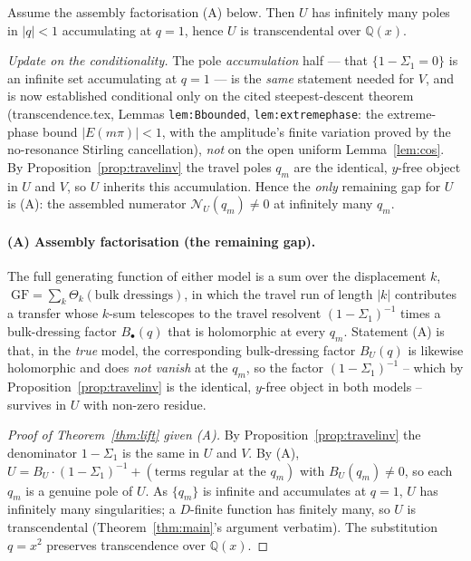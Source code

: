 \begin{theorem}\label{thm:lift}
Assume the assembly factorisation \textup{(A)} below.  Then $U$ has infinitely many
poles in $|q|<1$ accumulating at $q=1$, hence $U$ is transcendental over $\mathbb
Q(x)$.
\end{theorem}

\noindent\emph{Update on the conditionality.} The pole \emph{accumulation} half --- that
$\{1-\Sigma_1=0\}$ is an infinite set accumulating at $q=1$ --- is the \emph{same} statement
needed for $V$, and is now established conditional only on the cited steepest-descent theorem
(transcendence.tex, Lemmas \texttt{lem:Bbounded}, \texttt{lem:extremephase}: the extreme-phase
bound $|E(m\pi)|<1$, with the amplitude's finite variation proved by the no-resonance Stirling
cancellation), \emph{not} on the open uniform Lemma~\ref{lem:cos}. By
Proposition~\ref{prop:travelinv} the travel poles $q_m$ are the identical, $y$-free object in
$U$ and $V$, so $U$ inherits this accumulation. Hence the \emph{only} remaining gap for $U$ is
(A): the assembled numerator $\mathcal N_U(q_m)\ne0$ at infinitely many $q_m$.

\paragraph{(A) Assembly factorisation (the remaining gap).}
The full generating function of either model is a sum over the displacement $k$,
$\;\mathrm{GF}=\sum_{k}\Theta_k(\text{bulk dressings})$, in which the travel run of
length $|k|$ contributes a transfer whose $k$-sum telescopes to the travel resolvent
$(1-\Sigma_1)^{-1}$ times a bulk-dressing factor $B_\bullet(q)$ that is holomorphic
at every $q_m$.  Statement (A) is that, in the \emph{true} model, the corresponding
bulk-dressing factor $B_U(q)$ is likewise holomorphic and does \emph{not vanish} at
the $q_m$, so the factor $(1-\Sigma_1)^{-1}$ -- which by
Proposition~\ref{prop:travelinv} is the identical, $y$-free object in both models --
survives in $U$ with non-zero residue.

\begin{proof}[Proof of Theorem~\ref{thm:lift} given (A)]
By Proposition~\ref{prop:travelinv} the denominator $1-\Sigma_1$ is the same in $U$
and $V$.  By (A), $U=B_U\cdot(1-\Sigma_1)^{-1}+(\text{terms regular at the }q_m)$
with $B_U(q_m)\ne0$, so each $q_m$ is a genuine pole of $U$.  As $\{q_m\}$ is
infinite and accumulates at $q=1$, $U$ has infinitely many singularities; a $D$-finite
function has finitely many, so $U$ is transcendental
(Theorem~\ref{thm:main}'s argument verbatim).  The substitution $q=x^2$ preserves
transcendence over $\mathbb Q(x)$.
\end{proof}

